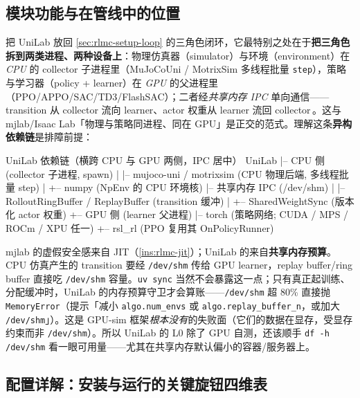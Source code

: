\subsection{模块功能与在管线中的位置}

把 UniLab 放回 \cref{sec:rlmc-setup-loop} 的三角色闭环，它最特别之处在于\textbf{把三角色拆到两类进程、两种设备上}：物理仿真器（simulator）与环境（environment）在 \emph{CPU} 的 collector 子进程里（MuJoCoUni / MotrixSim 多线程批量 \verb|step|），策略与学习器（policy + learner）在 \emph{GPU} 的父进程里（PPO/APPO/SAC/TD3/FlashSAC）；二者经\emph{共享内存 IPC} 单向通信——transition 从 collector 流向 learner、actor 权重从 learner 流回 collector\,\cite{unilab2026}。这与 mjlab/Isaac Lab「物理与策略同进程、同在 GPU」是正交的范式。理解这条\textbf{异构依赖链}是排障前提：

\begin{codebox}[text]{UniLab 依赖链（横跨 CPU 与 GPU 两侧，IPC 居中）}
UniLab
  |-- CPU 侧 (collector 子进程, spawn)
  |     |-- mujoco-uni / motrixsim  (CPU 物理后端, 多线程批量 step)
  |     +-- numpy                   (NpEnv 的 CPU 环境核)
  |-- 共享内存 IPC (/dev/shm)
  |     |-- RolloutRingBuffer / ReplayBuffer  (transition 缓冲)
  |     +-- SharedWeightSync                  (版本化 actor 权重)
  +-- GPU 侧 (learner 父进程)
        |-- torch (策略网络; CUDA / MPS / ROCm / XPU 任一)
        +-- rsl_rl (PPO 复用其 OnPolicyRunner)
\end{codebox}

\begin{insight}\label{ins:rlmc-unilab-shm}
mjlab 的虚假安全感来自 JIT（\cref{ins:rlmc-jit}）；UniLab 的来自\textbf{共享内存预算}。CPU 仿真产生的 transition 要经 \verb|/dev/shm| 传给 GPU learner，replay buffer/ring buffer 直接吃 \verb|/dev/shm| 容量。\verb|uv sync| 当然不会暴露这一点；只有真正起训练、分配缓冲时，UniLab 的内存预算守卫才会算账——\verb|/dev/shm| 超 80\% 直接抛 \verb|MemoryError|（提示「减小 \texttt{algo.num\_envs} 或 \texttt{algo.replay\_buffer\_n}，或加大 \texttt{/dev/shm}」）。这是 GPU-sim 框架\emph{根本没有}的失败面（它们的数据在显存，受显存约束而非 \texttt{/dev/shm}）。所以 UniLab 的 L0 除了 GPU 自测，还该顺手 \verb|df -h /dev/shm| 看一眼可用量——尤其在共享内存默认偏小的容器/服务器上。
\end{insight}

\subsection{配置详解：安装与运行的关键旋钮四维表}

